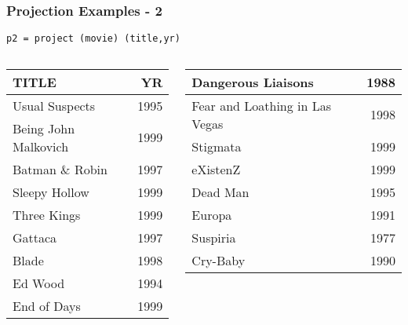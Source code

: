 \documentclass[dvipsnames]{beamer}
\theoremstyle{plain}
\begin{document}
\begin{frame}[fragile]
  \frametitle{Projection Examples - 2}

  \begin{example}
    \begin{lstlisting}
p2 = project (movie) (title,yr)
    \end{lstlisting}

    \pause
    \begin{columns}[b]
      \begin{tiny}
      \begin{table}
        \begin{tabular}{|l|r|}\hline
TITLE                          &   YR\\\hline\hline
Usual Suspects                 & 1995\\\hline
Being John Malkovich           & 1999\\\hline
Batman \& Robin                & 1997\\\hline
Sleepy Hollow                  & 1999\\\hline
Three Kings                    & 1999\\\hline
Gattaca                        & 1997\\\hline
Blade                          & 1998\\\hline
Ed Wood                        & 1994\\\hline
End of Days                    & 1999\\\hline
        \end{tabular}
      \end{table}
      \end{tiny}

      \begin{tiny}
      \begin{table}
        \begin{tabular}{|l|r|}\hline
Dangerous Liaisons             & 1988\\\hline
Fear and Loathing in Las Vegas & 1998\\\hline
Stigmata                       & 1999\\\hline
eXistenZ                       & 1999\\\hline
Dead Man                       & 1995\\\hline
Europa                         & 1991\\\hline
Suspiria                       & 1977\\\hline
Cry-Baby                       & 1990\\\hline
        \end{tabular}
      \end{table}
      \end{tiny}
    \end{columns}
  \end{example}
\end{frame}
\end{document}
